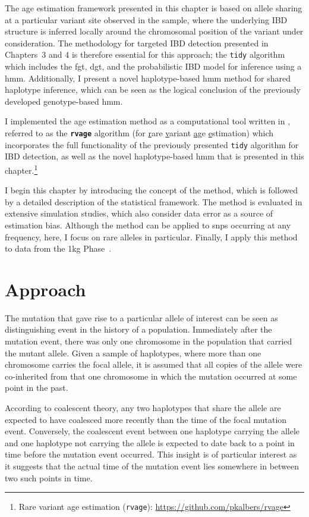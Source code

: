 The age estimation framework presented in this chapter is based on allele sharing at a particular variant site observed in the sample, where the underlying IBD structure is inferred locally around the chromosomal position of the variant under consideration.
The methodology for targeted IBD detection presented in Chapters~3 and 4 is therefore essential for this approach; \ie the \texttt{tidy} algorithm which includes the \gls{fgt}, \gls{dgt}, and the probabilistic IBD model for inference using a \gls{hmm}.
Additionally, I present a novel haplotype-based \gls{hmm} method for shared haplotype inference, which can be seen as the logical conclusion of the previously developed genotype-based \gls{hmm}.

I implemented the age estimation method as a computational tool written in \cpp, referred to as the \textbf{\texttt{rvage}} algorithm (for \underline{r}are \underline{v}ariant \underline{a}\underline{g}e \underline{e}stimation) which incorporates the full functionality of the previously presented \texttt{tidy} algorithm for IBD detection, as well as the novel haplotype-based \gls{hmm} that is presented in this chapter.\footnote{Rare variant age estimation (\texttt{rvage}): \url{https://github.com/pkalbers/rvage}}

I begin this chapter by introducing the concept of the method, which is followed by a detailed description of the statistical framework.
The method is evaluated in extensive simulation studies, which also consider data error as a source of estimation bias.
Although the method can be applied to \glspl{snp} occurring at any frequency, here, I focus on rare alleles in particular.
Finally, I apply this method to data from the \gls{1kg} Phase~.



%
\section{Approach}
%

The mutation that gave rise to a particular allele of interest can be seen as distinguishing event in the history of a population.
Immediately after the mutation event, there was only one chromosome in the population that carried the mutant allele.
Given a sample of haplotypes, where more than one chromosome carries the focal allele, it is assumed that all copies of the allele were co-inherited from that one chromosome in which the mutation occurred at some point in the past.

According to coalescent theory, any two haplotypes that share the allele are expected to have coalesced more recently than the time of the focal mutation event.
Conversely, the coalescent event between one haplotype carrying the allele and one haplotype not carrying the allele is expected to date back to a point in time before the mutation event occurred.
This insight is of particular interest as it suggests that the actual time of the mutation event lies somewhere in between two such points in time.

